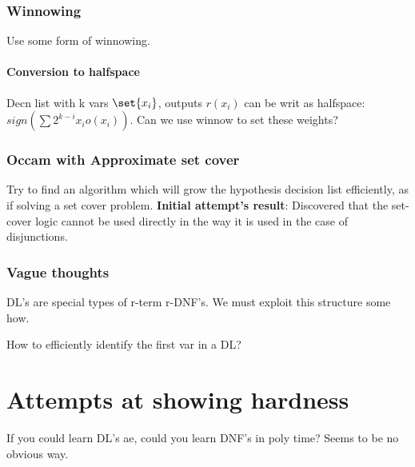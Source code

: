 \documentclass[10pt]{amsart}
\begin{document}
\section{Winnowing}
Use some form of winnowing.

\subsection{Conversion to halfspace}
Decn list with k vars $\set{x_{i}}$, outputs $r(x_{i})$ can be writ as halfspace: $sign(\sum 2^{k-i}x_{i}o(x_{i}))$. Can we use winnow to set these weights?

\section{Occam with Approximate set cover}
Try to find an algorithm which will grow the hypothesis decision list efficiently, as if solving a set cover problem. \textbf{Initial attempt's result}: Discovered that the set-cover logic cannot be used directly in the way it is used in the case of disjunctions.

\section{Vague thoughts}
DL's are special types of r-term r-DNF's. We must exploit this structure some how.

How to efficiently identify the first var in a DL?

\part{Attempts at showing hardness}
If you could learn DL's ae, could you learn DNF's in poly time? Seems to be no obvious way.


% 
% 
\end{document}
